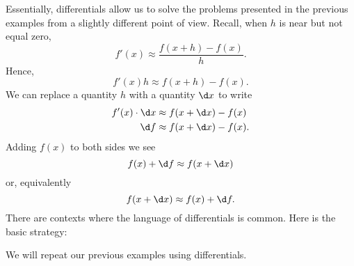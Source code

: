 \documentclass{ximera}
\begin{document}
Essentially, differentials allow us to solve the problems presented in
the previous examples from a slightly different point of view. Recall,
when $h$ is near but not equal zero,
\[
f'(x) \approx \frac{f(x+h)-f(x)}{h}.
\]
Hence, 
\[
f'(x)h \approx f(x+h)-f(x).
\]
We can replace a quantity $h$ with a quantity $\d x$ to write
\begin{align*}
f'(x)\cdot \d x &\approx f(x+\d x)-f(x)\\
\d f &\approx f(x+\d x)-f(x).
\end{align*}
Adding $f(x)$ to both sides we see
\[
f(x) + \d f\approx f(x+\d x)
\]
or, equivalently
\[
f(x+\d x)\approx f(x) + \d f .
\]
There
are contexts where the language of differentials is common. Here is
the basic strategy:
\begin{image}
\end{image}

We will repeat our previous examples using differentials.
\end{document}
